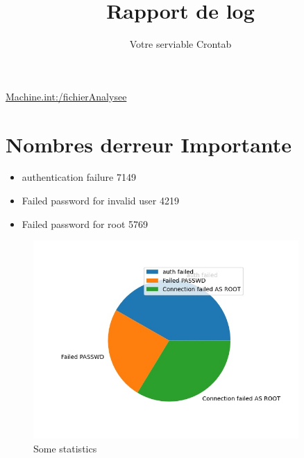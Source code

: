 \documentclass[10pt,a4paper]{article}
\title{Rapport de log}
\author{Votre serviable Crontab}
\begin{document}
\maketitle
\url{Machine.int:/fichierAnalysee}
\section{Nombres derreur Importante} 
\begin{itemize}
\item authentication failure 7149
\item Failed password for invalid user 4219
\item Failed password for root 5769
\end{itemize}
\begin{figure}[h!]
\centering
\includegraphics[width=0.9\textwidth]{stats.jpg}
\caption{Some statistics}
\label{fig:universe}
\end{figure}
\end{document}
